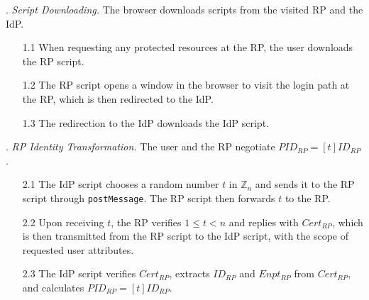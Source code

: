 \vspace{1mm}
. {\em Script Downloading.}
The browser downloads scripts from the visited RP and the IdP.
\vspace{-\topsep}
\begin{itemize}
\setlength{\topsep}{0pt}
\setlength{\partopsep}{0pt}
\setlength{\itemsep}{0pt}
\setlength{\parsep}{0pt}
\setlength{\parskip}{0pt}
\item[1.1]
When requesting any protected resources at the RP, the user downloads the RP script.
\item[1.2]
The RP script opens a window in the browser to visit the login path at the RP, which is then redirected to the IdP.
\item[1.3]
The redirection to the IdP downloads the IdP script.
\end{itemize}



. {\em RP Identity Transformation.}
The user and the RP negotiate $PID_{RP} = [t]{ID_{RP}}$.
\vspace{-\topsep}
\begin{itemize}
\setlength{\topsep}{0pt}
\setlength{\partopsep}{0pt}
\setlength{\itemsep}{0pt}
\setlength{\parsep}{0pt}
\setlength{\parskip}{0pt}
\item[2.1] The IdP script chooses a random number $t$ in $\mathbb{Z}_n$ and sends it to the RP script through \verb+postMessage+. The RP script then forwards $t$ to the RP.
\item[2.2] Upon receiving $t$, the RP verifies $1 \leq t < n$ and %
 replies with $Cert_{RP}$, which is then transmitted from the RP script to the IdP script,
    with the scope of requested user attributes.  %
\item[2.3] The IdP script verifies $Cert_{RP}$, extracts $ID_{RP}$ and $Enpt_{RP}$ from $Cert_{RP}$, and calculates $PID_{RP}=[t]{ID_{RP}}$.

\end{itemize}


